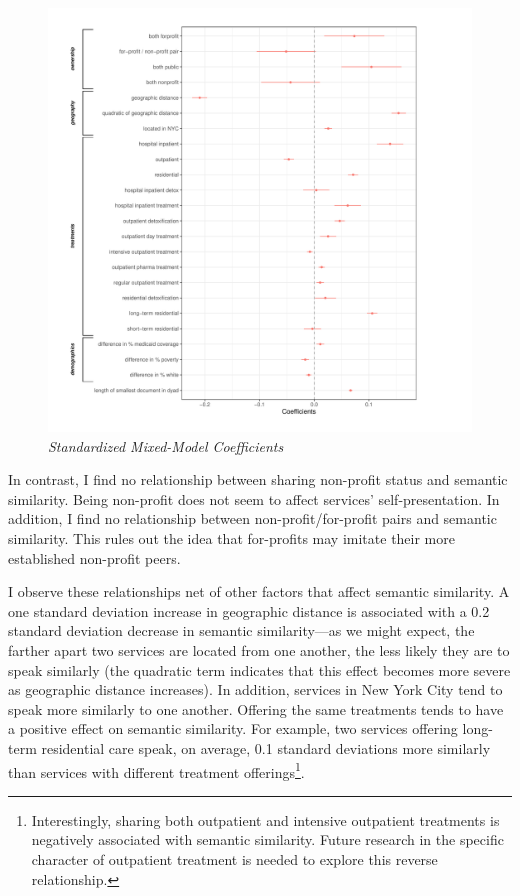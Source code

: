 \documentclass[
  12pt,
]{article}
\begin{document}
\begin{figure}

{\centering \includegraphics{syp_files/figure-latex/unnamed-chunk-5-1} 

}

\caption{\textit{Standardized Mixed-Model Coefficients}}\label{fig:unnamed-chunk-5}
\end{figure}

\vspace{12pt}

In contrast, I find no relationship between sharing non-profit status and semantic similarity. Being non-profit does not seem to affect services' self-presentation. In addition, I find no relationship between non-profit/for-profit pairs and semantic similarity. This rules out the idea that for-profits may imitate their more established non-profit peers.

\vspace{12pt}

I observe these relationships net of other factors that affect semantic similarity. A one standard deviation increase in geographic distance is associated with a 0.2 standard deviation decrease in semantic similarity---as we might expect, the farther apart two services are located from one another, the less likely they are to speak similarly (the quadratic term indicates that this effect becomes more severe as geographic distance increases). In addition, services in New York City tend to speak more similarly to one another. Offering the same treatments tends to have a positive effect on semantic similarity. For example, two services offering long-term residential care speak, on average, 0.1 standard deviations more similarly than services with different treatment offerings\footnote{Interestingly, sharing both outpatient and intensive outpatient treatments is negatively associated with semantic similarity. Future research in the specific character of outpatient treatment is needed to explore this reverse relationship.}.
\end{document}
